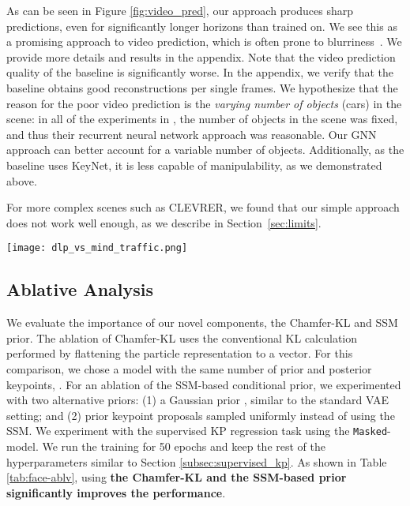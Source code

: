 \documentclass[nohyperref]{article}
\theoremstyle{plain}
\theoremstyle{definition}
\theoremstyle{remark}
\begin{document}
As can be seen in Figure \ref{fig:video_pred}, our approach produces sharp predictions, even for significantly longer horizons than trained on. 
We see this as a promising approach to video prediction, which is often prone to blurriness~\cite{lee2018savp, yan2021videogpt, hafner2020dreamer2}. We provide more details and results in the appendix. 
Note that the video prediction quality of the \citet{minderer2019unsupervised} baseline is significantly worse. In the appendix, we verify that the baseline obtains good reconstructions per single frames.
We hypothesize that the reason for the poor video prediction is the \textit{varying number of objects} (cars) in the scene: in all of the experiments in \citet{minderer2019unsupervised}, the number of objects in the scene was fixed, and thus their recurrent neural network approach was reasonable. Our GNN approach can better account for a variable number of objects. Additionally, as the baseline uses KeyNet, it is less capable of manipulability, as we demonstrated above.

For more complex scenes 
such as CLEVRER, we found that our simple approach does not work well enough, as we describe in Section~\ref{sec:limits}.

\begin{figure*}[h]
     \centering
     \texttt{[image: dlp\_vs\_mind\_traffic.png]}
        \caption{Video prediction on the Traffic dataset. We use the pre-trained \texttt{Object} model to provide the particle-representation and a GNN to predict the temporal change in particles. Top - ground truth, middle - \citet{minderer2019unsupervised} prediction, bottom - DLP (ours) prediction.}
        \label{fig:video_pred}
\end{figure*}

\subsection{Ablative Analysis}
\label{sec:ablation}
We evaluate the importance of our novel components, the Chamfer-KL and SSM prior. 
The ablation of Chamfer-KL uses the conventional KL calculation performed by flattening the particle representation to a vector. For this comparison, we chose a model with the same number of prior and posterior keypoints, .
For an ablation of the SSM-based conditional prior, we experimented with two alternative priors: (1) a Gaussian prior , similar to the standard VAE setting; and (2) prior keypoint proposals sampled uniformly  instead of using the SSM.
We experiment with the supervised KP regression task using the \texttt{Masked}-model.
We run the training for 50 epochs and keep the rest of the hyperparameters similar to Section \ref{subsec:supervised_kp}. As shown in Table \ref{tab:face-ablv}, using \textbf{the Chamfer-KL and the SSM-based prior significantly improves the performance}.
\end{document}
